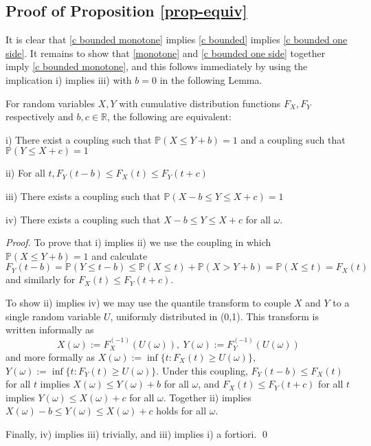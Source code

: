 \documentclass[smallextended,envcountsect]{svjour3}
\begin{document}
\subsection{Proof of Proposition \ref{prop-equiv}}

 It is clear that \eqref{c bounded monotone} implies \eqref{c bounded} implies \eqref{c bounded one side}.  It remains to show that \eqref{monotone} and \eqref{c bounded one side} together imply \eqref{c bounded monotone}, and this follows immediately by using the implication i) implies iii) with $b = 0$ in the following Lemma.

\begin{lemma} \label{lem-xy} For random variables $X,Y$ with cumulative distribution functions $F_X, F_Y$ respectively and $b,c \in {\mathbb{R}}$, the following are equivalent:

i)  There exist a coupling such that ${\mathbb{P}}(X \le Y+b) =1$ and a coupling such that ${\mathbb{P}}(Y \le X+c) = 1$

ii)  For all $t,  F_Y(t-b) \le F_X(t) \le F_Y(t+c)$

iii)  There exists a coupling such that ${\mathbb{P}}(X-b \le Y \le X+c)=1$

iv) There exists a coupling such that $X-b \le Y \le X+c$ for all $\omega$.
\end{lemma}

\begin{proof}  To prove that i) implies ii) we use the coupling in which ${\mathbb{P}}(X \le Y+b) =1$ and calculate
     $$
     F_Y(t-b) = {\mathbb{P}}(Y \le t-b) \le {\mathbb{P}}(X \le t) + {\mathbb{P}}(X > Y+b) = {\mathbb{P}}(X \le t) = F_X(t)
     $$
and similarly for $F_X(t) \le F_Y(t+c)$.

To show ii) implies iv) we may use the quantile transform to couple $X$ and $Y$ to a single random variable $U$, uniformly distributed in (0,1).  This transform is written informally as
$$
    X(\omega) := F_X^{(-1)}(U(\omega)), \  Y(\omega) := F_Y^{(-1)}(U(\omega)) $$
and more formally as $X(\omega) := \inf \{t:  F_X(t) \ge U(\omega) \}$, $Y(\omega) := \inf \{t:  F_Y(t) \ge U(\omega) \}$.
Under this coupling, $F_Y(t-b) \le F_X(t)$ for all $t$ implies $X(\omega) \le Y(\omega)+b$ for all $\omega$, and $F_X(t) \le F_Y(t+c)$ for all $t$ implies $Y(\omega) \le X(\omega)+c$ for all $\omega$.  Together ii) implies $ X(\omega)-b \le Y(\omega) \le X(\omega)+c $ holds for all $\omega$.

   Finally, iv) implies iii) trivially, and  iii) implies i) a fortiori.
\qed \end{proof}
\end{document}
